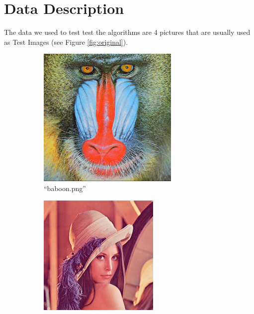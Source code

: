 \documentclass[sigconf,authorversion]{acmart}
\begin{document}
\section{Data Description}
The data we used to test test the algorithms are 4 pictures that are usually used as Test Images (see Figure \ref{fig:original}).
\begin{figure}[hbtp]
  \begin{subfigure}[b]{0.45\columnwidth}
      \includegraphics[width=\columnwidth]{../imgs/baboon.png}
      \caption{``baboon.png''}
      \label{subfig:baboon}
  \end{subfigure}
  \hspace{0.01\textwidth}
  \begin{subfigure}[b]{0.45\columnwidth}
      \includegraphics[width=\columnwidth]{../imgs/lena.png}

\end{subfigure}
\end{figure}
\end{document}
